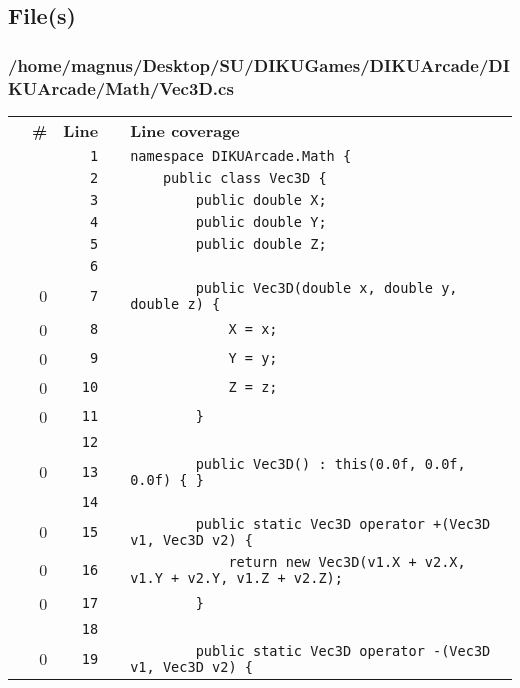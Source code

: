 \documentclass[a4paper,landscape,10pt]{article}
\begin{document}
\subsection{File(s)}
\subsubsection{/home/magnus/Desktop/SU/DIKUGames/DIKUArcade/DIKUArcade/Math/Vec3D.cs}
\begin{longtable}[l]{lrrll}
\textbf{} & \textbf{\#} & \textbf{Line} & \textbf{} & \textbf{Line coverage}\\
\cellcolor{gray} &  & \verb~1~ & & \verb~namespace DIKUArcade.Math {~\\
\cellcolor{gray} &  & \verb~2~ & & \verb~    public class Vec3D {~\\
\cellcolor{gray} &  & \verb~3~ & & \verb~        public double X;~\\
\cellcolor{gray} &  & \verb~4~ & & \verb~        public double Y;~\\
\cellcolor{gray} &  & \verb~5~ & & \verb~        public double Z;~\\
\cellcolor{gray} &  & \verb~6~ & & \verb~~\\
\cellcolor{red} & 0 & \verb~7~ & & \verb~        public Vec3D(double x, double y, double z) {~\\
\cellcolor{red} & 0 & \verb~8~ & & \verb~            X = x;~\\
\cellcolor{red} & 0 & \verb~9~ & & \verb~            Y = y;~\\
\cellcolor{red} & 0 & \verb~10~ & & \verb~            Z = z;~\\
\cellcolor{red} & 0 & \verb~11~ & & \verb~        }~\\
\cellcolor{gray} &  & \verb~12~ & & \verb~~\\
\cellcolor{red} & 0 & \verb~13~ & & \verb~        public Vec3D() : this(0.0f, 0.0f, 0.0f) { }~\\
\cellcolor{gray} &  & \verb~14~ & & \verb~~\\
\cellcolor{red} & 0 & \verb~15~ & & \verb~        public static Vec3D operator +(Vec3D v1, Vec3D v2) {~\\
\cellcolor{red} & 0 & \verb~16~ & & \verb~            return new Vec3D(v1.X + v2.X, v1.Y + v2.Y, v1.Z + v2.Z);~\\
\cellcolor{red} & 0 & \verb~17~ & & \verb~        }~\\
\cellcolor{gray} &  & \verb~18~ & & \verb~~\\
\cellcolor{red} & 0 & \verb~19~ & & \verb~        public static Vec3D operator -(Vec3D v1, Vec3D v2) {~\\

\end{longtable}
\end{document}

